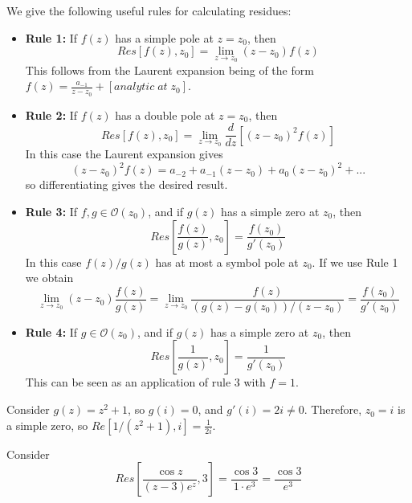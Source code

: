 \documentclass[12pt, a4paper, oneside, openright, titlepage]{book}
\begin{document}
\begin{proc}
    We give the following useful rules for calculating residues:\begin{itemize}
        \item \textbf{Rule 1:} If $f(z)$ has a simple pole at $z = z_0$, then $$Res[f(z),z_0] = \lim\limits_{z\rightarrow z_0}(z-z_0)f(z)$$
            This follows from the Laurent expansion being of the form $f(z) = \frac{a_{-1}}{z-z_0}+[analytic\;at\;z_0]$.
        \item \textbf{Rule 2:} If $f(z)$ has a double pole at $z = z_0$, then $$Res[f(z),z_0] = \lim\limits_{z\rightarrow z_0}\frac{d}{dz}[(z-z_0)^2f(z)]$$
            In this case the Laurent expansion gives \begin{equation*}
                (z-z_0)^2f(z) = a_{-2}+a_{-1}(z-z_0)+a_0(z-z_0)^2+...
            \end{equation*}
            so differentiating gives the desired result.
        \item \textbf{Rule 3:} If $f,g \in \mathcal{O}(z_0)$, and if $g(z)$ has a simple zero at $z_0$, then $$Res\left[\frac{f(z)}{g(z)},z_0\right] = \frac{f(z_0)}{g'(z_0)}$$ In this case $f(z)/g(z)$ has at most a symbol pole at $z_0$. If we use Rule 1 we obtain \begin{equation*}
                \lim\limits_{z\rightarrow z_0}(z-z_0)\frac{f(z)}{g(z)} = \lim\limits_{z\rightarrow z_0}\frac{f(z)}{(g(z)-g(z_0))/(z-z_0)} = \frac{f(z_0)}{g'(z_0)}
        \end{equation*}
        \item \textbf{Rule 4:} If $g \in \mathcal{O}(z_0)$, and if $g(z)$ has a simple zero at $z_0$, then $$Res\left[\frac{1}{g(z)},z_0\right] = \frac{1}{g'(z_0)}$$ This can be seen as an application of rule $3$ with $f = 1$.
    \end{itemize}
\end{proc}


\begin{eg}
    Consider $g(z) = z^2+1$, so $g(i) = 0$, and $g'(i) = 2i \neq 0$. Therefore, $z_0 = i$ is a simple zero, so $Re[1/(z^2+1),i] = \frac{1}{2i}$.
\end{eg}

\begin{eg}
    Consider \begin{equation*}
        Res\left[\frac{\cos z}{(z-3)e^z},3\right] = \frac{\cos 3}{1\cdot e^3} = \frac{\cos 3}{e^3}
    \end{equation*}
\end{eg}
\end{document}

